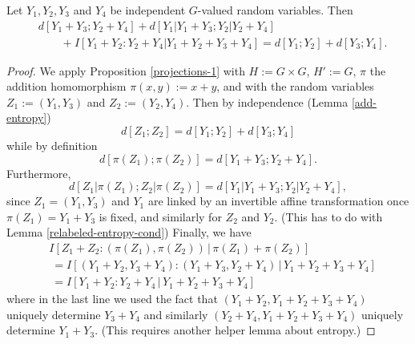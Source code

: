 \begin{corollary}\label{cor-fibre}
  \leanok
  Let $Y_1,Y_2,Y_3$ and $Y_4$ be independent $G$-valued random variables.
  Then
\begin{align*}
  & d[Y_1+Y_3; Y_2+Y_4] + d[Y_1|Y_1+Y_3; Y_2|Y_2+Y_4] \\
  &\qquad + I[ Y_1+Y_2 : Y_2 + Y_4 | Y_1+Y_2+Y_3+Y_4 ] = d[Y_1; Y_2] + d[ Y_3; Y_4].
\end{align*}
\end{corollary}

\begin{proof}
  We apply Proposition \ref{projections-1} with $H := G \times G$, $H' := G$, $\pi$ the addition homomorphism $\pi(x,y) := x+y$, and with the random variables $Z_1 := (Y_1,Y_3)$ and $Z_2 := (Y_2,Y_4)$.  Then by independence (Lemma \ref{add-entropy})
\[
  d[Z_1; Z_2] = d[Y_1; Y_2] + d[Y_3; Y_4]
\]
while by definition
\[
  d[\pi(Z_1); \pi(Z_2)] = d[Y_1+Y_3; Y_2+Y_4].
\]
Furthermore,
\[
  d[Z_1|\pi(Z_1); Z_2|\pi(Z_2)] = d[Y_1|Y_1+Y_3;Y_2|Y_2+Y_4],
\]
since $Z_1=(Y_1,Y_3)$ and $Y_1$ are linked by an invertible affine transformation once $\pi(Z_1)=Y_1+Y_3$ is fixed, and similarly for $Z_2$ and $Y_2$.  (This has to do with Lemma \ref{relabeled-entropy-cond})
Finally, we have
\begin{align*}
  &I[Z_1 + Z_2 : (\pi(Z_1),\pi(Z_2)) \,|\, \pi(Z_1) + \pi(Z_2)] \\
  &\ = I[(Y_1+Y_2, Y_3+Y_4) : (Y_1+Y_3, Y_2+Y_4) \,|\, Y_1+Y_2+Y_3+Y_4] \\
  &\ = I[Y_1+Y_2 : Y_2+Y_4 \,|\, Y_1+Y_2+Y_3+Y_4]
\end{align*}
where in the last line we used the fact that $(Y_1+Y_2, Y_1+Y_2+Y_3+Y_4)$ uniquely determine $Y_3+Y_4$ and similarly
$(Y_2+Y_4, Y_1+Y_2+Y_3+Y_4)$ uniquely determine $Y_1+Y_3$.  (This requires another helper lemma about entropy.)
\end{proof}
